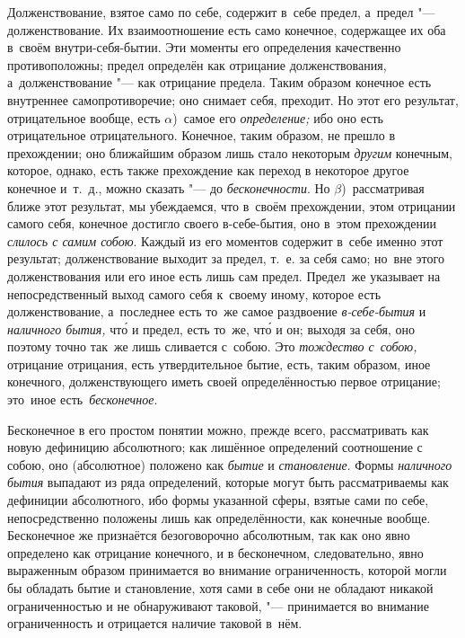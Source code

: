 Долженствование, взятое само по себе, содержит в~себе предел, а~предел "---
долженствование. Их взаимоотношение есть само конечное, содержащее их оба
в~своём внутри-себя-бытии. Эти моменты его определения качественно
противоположны; предел определён как отрицание долженствования,
а~долженствование "--- как отрицание предела. Таким образом конечное есть
внутреннее самопротиворечие; оно снимает себя, преходит. Но этот его результат,
отрицательное вообще, есть $\alpha$)~самое его {\em определение;} ибо оно есть
отрицательное отрицательного. Конечное, таким образом, не прешло в прехождении;
оно ближайшим образом лишь стало некоторым {\em другим} конечным, которое,
однако, есть также прехождение как переход в некоторое другое конечное и~т.~д.,
можно сказать "--- до {\em бесконечности}. Но $\beta$)~рассматривая ближе этот
результат, мы убеждаемся, что в~своём прехождении, этом отрицании самого себя,
конечное достигло своего в-себе-бытия, оно в~этом прехождении
{\em слилось с самим собою}. Каждый из его моментов содержит в~себе именно этот
результат; долженствование выходит за предел, т.~е. за себя само; но~вне этого
долженствования или его иное есть лишь сам предел. Предел~же указывает
на непосредственный выход самого себя к~своему иному, которое есть
долженствование, а~последнее есть то~же самое раздвоение {\em в-себе-бытия} и
{\em наличного бытия,} чт\'{о} и предел, есть то~же, чт\'{о} и он; выходя за себя,
оно поэтому точно так~же лишь сливается с~собою. Это {\em тождество с~собою,}
отрицание отрицания, есть утвердительное бытие, есть, таким образом, иное
конечного, долженствующего иметь своей определённостью первое отрицание;
это~иное есть~{\em бесконечное}.


Бесконечное в его простом понятии можно, прежде всего, рассматривать как новую
дефиницию абсолютного; как лишённое определений соотношение с собою, оно
(абсолютное) положено как {\em бытие} и {\em становление}. Формы
{\em наличного бытия} выпадают из ряда определений, которые могут быть
рассматриваемы как дефиниции абсолютного, ибо формы указанной сферы, взятые
сами по себе, непосредственно положены лишь как определённости, как конечные
вообще. Бесконечное же признаётся безоговорочно абсолютным, так как оно явно
определено как отрицание конечного, и в бесконечном, следовательно, явно
выраженным образом принимается во внимание ограниченность, которой могли бы
обладать бытие и становление, хотя сами в себе они не обладают никакой
ограниченностью и не обнаруживают таковой, "--- принимается во внимание
ограниченность и отрицается наличие таковой в~нём.

